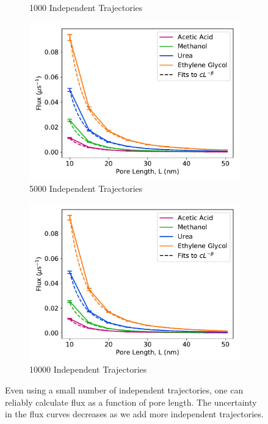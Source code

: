 \documentclass{article}
\begin{document}
\begin{figure}
\begin{subfigure}{0.45\textwidth}
  \caption{1000 Independent Trajectories}\label{fig:N1000}
  \end{subfigure}
  \begin{subfigure}{0.45\textwidth}
  \includegraphics[width=\textwidth]{flux_curves_N5000.pdf}
  \caption{5000 Independent Trajectories}\label{fig:N5000}
  \end{subfigure}
  \begin{subfigure}{0.45\textwidth}
  \includegraphics[width=\textwidth]{flux_curves_N9984.pdf}
  \caption{10000 Independent Trajectories}\label{fig:N10000}
  \end{subfigure}
  \caption{Even using a small number of independent trajectories, one can
  reliably calculate flux as a function of pore length. The uncertainty in
  the flux curves decreases as we add more independent trajectories.}\label{fig:flux_curve_sensitivity}
  \end{figure}
  

  \clearpage
  
\end{document}
